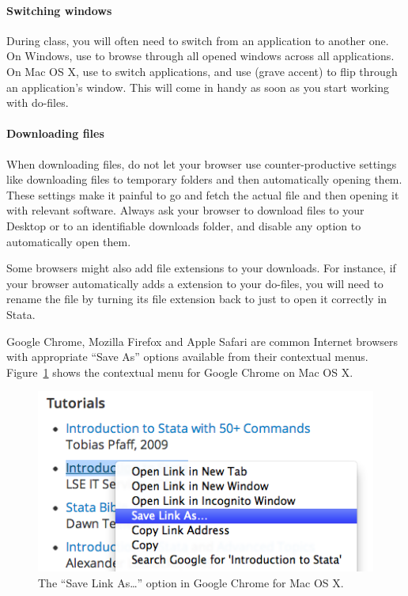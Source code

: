 \paragraph{Switching windows}%
%
During class, you will often need to switch from an application to another one. On Windows, use  to browse through all opened windows across all applications. On Mac OS X, use  to switch applications, and use  (grave accent) to flip through an application's window. This will come in handy as soon as you start working with do-files.%


\paragraph{Downloading files}%
%
When downloading files, do not let your browser use counter-productive settings like downloading files to temporary folders and then automatically opening them. These settings make it painful to go and fetch the actual file and then opening it with relevant software. Always ask your browser to download files to your Desktop or to an identifiable downloads folder, and disable any option to automatically open them.

Some browsers might also add file extensions to your downloads. For instance, if your browser automatically adds a  extension to your do-files, you will need to rename the file by turning its file extension back to just  to open it correctly in Stata.

Google Chrome, Mozilla Firefox and Apple Safari are common Internet browsers with appropriate ``Save As'' options available from their contextual menus. Figure~\ref{fig:save-as} shows the contextual menu for Google Chrome on Mac OS X.

\begin{figure}
	\includegraphics[scale=.5]{images/macosx-save-as.png}
	\caption{The ``Save Link As…'' option in Google Chrome for Mac OS X.}
	\label{fig:save-as}
\end{figure}


